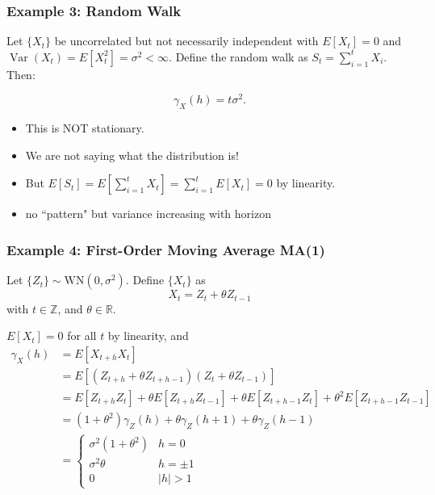 \documentclass{beamer}
\begin{document}

\begin{frame}
\frametitle{Example 3: Random Walk}

Let $\{X_t\}$ be uncorrelated but not necessarily independent with $E[X_t] = 0$ and $\operatorname{Var}(X_t) = E[X_t^2] = \sigma^2 < \infty$. Define the random walk as $S_t = \sum_{i=1}^t X_i$. Then:

\[
\gamma_X(h) =  t \sigma^2.
\]

\begin{itemize}
\item This is NOT stationary.
\item We are not saying what the distribution is!
\item But $E[S_t] = E[\sum_{i=1}^t X_t] = \sum_{i=1}^t E[X_t] = 0$ by linearity.
\item no ``pattern" but variance increasing with horizon
\end{itemize}

\end{frame}


\begin{frame}
\frametitle{Example 4: First-Order Moving Average MA(1) }

Let $\{Z_t\} \sim \text{WN}(0, \sigma^2)$. Define $\{X_t\}$ as
\[
X_t = Z_t + \theta Z_{t-1}
\]
with $t \in \mathbb{Z}$, and $\theta \in \mathbb{R}$. 
\newline

$E[X_t] = 0$ for all $t$ by linearity, and 
\begin{align*}
\gamma_X(h) &= E[X_{t+h}X_t] \\
&= E[(Z_{t+h} + \theta Z_{t+h-1})(Z_t + \theta Z_{t-1})]  \\
&= E[Z_{t+h}Z_t] + \theta E[Z_{t+h} Z_{t-1}] + \theta E[Z_{t+h-1}Z_t] + \theta^2E[Z_{t+h-1}Z_{t-1}]  \\
&= (1 + \theta^2) \gamma_Z(h) + \theta \gamma_Z(h+1) + \theta \gamma_Z(h-1)   \\
&= \begin{cases} 
      \sigma^2(1 + \theta^2) & h = 0 \\
      \sigma^2\theta & h = \pm 1 \\
      0 & |h| > 1
   \end{cases}
\end{align*}
\end{frame}
\end{document}

